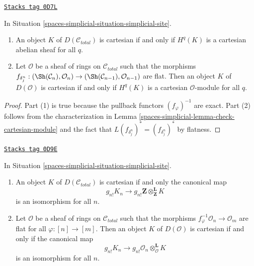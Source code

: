 \begin{lemma}
\label{spaces-simplicial-lemma-derived-cartesian-modules}
\href{https://stacks.math.columbia.edu/tag/0D7L}{\texttt{Stacks tag 0D7L}}

In Situation \ref{spaces-simplicial-situation-simplicial-site}.
\begin{enumerate}
\item An object $K$ of $D(\mathcal{C}_{total})$ is cartesian if and only
if $H^q(K)$ is a cartesian abelian sheaf for all $q$.
\item Let $\mathcal{O}$ be a sheaf
of rings on $\mathcal{C}_{total}$ such that the morphisms
$f_{\delta^n_j} : (\Sh(\mathcal{C}_n), \mathcal{O}_n)
\to (\Sh(\mathcal{C}_{n - 1}), \mathcal{O}_{n - 1})$ are flat.
Then an object $K$ of $D(\mathcal{O})$ is cartesian if and only
if $H^q(K)$ is a cartesian $\mathcal{O}$-module for all $q$.
\end{enumerate}
\end{lemma}

\begin{proof}
Part (1) is true because the pullback functors $(f_\varphi)^{-1}$
are exact. Part (2) follows from the characterization in
Lemma \ref{spaces-simplicial-lemma-check-cartesian-module}
and the fact that $L(f_{\delta^n_j})^* = (f_{\delta^n_j})^*$
by flatness.
\end{proof}

\begin{lemma}
\label{spaces-simplicial-lemma-derived-cartesian-shriek}
\href{https://stacks.math.columbia.edu/tag/0D9E}{\texttt{Stacks tag 0D9E}}

In Situation \ref{spaces-simplicial-situation-simplicial-site}.
\begin{enumerate}
\item An object $K$ of $D(\mathcal{C}_{total})$ is cartesian if and only
the canonical map
$$
g_{n!}K_n \longrightarrow
g_{n!}\mathbf{Z} \otimes^\mathbf{L}_\mathbf{Z} K
$$
is an isomorphism for all $n$.
\item Let $\mathcal{O}$ be a sheaf of rings on $\mathcal{C}_{total}$
such that the morphisms $f_\varphi^{-1}\mathcal{O}_n \to \mathcal{O}_m$
are flat for all $\varphi : [n] \to [m]$. Then an object $K$ of
$D(\mathcal{O})$ is cartesian if and only if the canonical map
$$
g_{n!}K_n \longrightarrow
g_{n!}\mathcal{O}_n \otimes^\mathbf{L}_\mathcal{O} K
$$
is an isomorphism for all $n$.
\end{enumerate}
\end{lemma}


